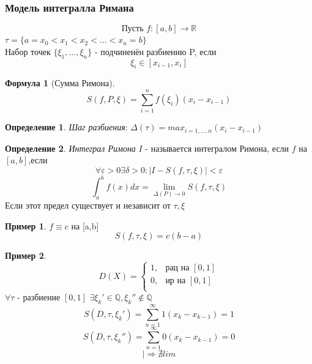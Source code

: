 \documentclass[a4paper]{article}
\theoremstyle{definition}
\newtheorem*{definition*}{Определение}
\newtheorem*{exmp}{Пример}
\newtheorem*{formula}{Формула}
\newcommand\abs[1]{%
\mbox{$| #1 |$}}
\newcommand\InAll[0]{%
|\Rightarrow}
\numberwithin{theorem}{subsection}
\numberwithin{lemma}{subsection}
\numberwithin{definition}{subsection}
\numberwithin{comment*}{subsection}
\numberwithin{consequence}{subsection}
\numberwithin{property}{subsection}
\begin{document}
\subsubsection{Модель интегралла Римана}
$$\text{Пусть } f:[a,b] \rightarrow \mathbb{R}$$
$ \tau = \{ a= x_0 <x_1 < x_2< \dots < x_n = b \} $\\
Набор точек $\{ \xi_1, \dots ,\xi_n \}$ - подчиненён разбиению P, если $$ \xi_i\in[x_{i-1}, x_i] $$
\begin{formula}[Сумма Римона]
 $$ S(f, P, \xi)=\sum_{i=1}^{n}{f(\xi_i)(x_i-x_{i-1})} $$
\end{formula}
\begin{definition*}
 \textit{Шаг разбиения}: $\Delta(\tau) = max_{i=1, \dots,n} (x_i - x_{i-1})$
\end{definition*}
\begin{definition*}
 \textit{Интеграл Римона}
 $I$ - называется интегралом Римона, если $f$ на $[a,b]$,если
 $$ \forall{\varepsilon}>0 \exists{\delta}>0: \abs{I-S(f, \tau, \xi)}<\varepsilon $$
 $$ \int_a^b f(x)  dx = \lim_{\Delta(P) \rightarrow 0}{S(f,\tau,\xi)} $$
 Если этот предел существует и независит от $\tau, \xi$
\end{definition*}
\begin{exmp}
 $f \equiv c $ на [a,b]
 $$ S(f, \tau, \xi) = c(b-a) $$
\end{exmp}
\begin{exmp}
 $$D(X) = \begin{cases}
   1, & \text{рац на }[0,1] \\
   0, & \text{ир на }[0,1]  \\
  \end{cases}$$
 $\forall{\tau} $ - разбиение $[0,1]$ $\exists{\xi_k' }\in \mathbb{Q}, \xi_k''  \notin \mathbb{Q} $
 $$S(D, \tau, \xi_k'  ) = \sum_{n=1}^{\infty}{1(x_k - x_{k-1})} = 1$$
 $$S(D, \tau, \xi_k'' ) = \sum_{n=1}^{\infty}{0(x_k - x_{k-1})} = 0 $$
 $$ \InAll \nexists lim $$
\end{exmp}
\end{document}
